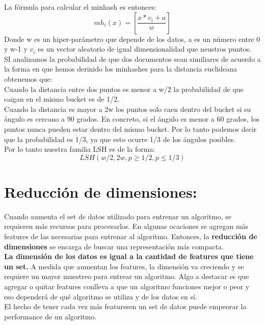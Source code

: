 \documentclass[titlepage,a4paper]{article}
\begin{document}
La fórmula para calcular el minhash es entonces:  $$ mh_i(x) = \left[ \frac{x*v_i +a}{w}\right] $$ Donde w es un hiper-parámetro que depende de los datos, a es un número entre 0 y w-1 y $v_i$ es un vector aleatorio de igual dimensionalidad que neustros puntos. \\

SI analizamos la probabilidad de que dos documentos sean similiares de acuerdo a la forma en que hemos derinido los minhashes  para la distancia euclideana obtenemos que: \\

Cuando la distancia entre dos puntos es menor a w/2 la probabilidad de que caigan en el mismo bucket es de 1/2. \\

Cuando la distancia es mayor a 2w  los puntos solo caen dentro del bucket si su ángulo es cercano a 90 grados. En concreto, si el ángulo es menor a 60 grados, los puntos nunca pueden estar dentro del mismo bucket. Por lo tanto podemos decir que la probabilidad es 1/3, ya que esto ocurre 1/3 de los ángulos posibles. \\

Por lo tanto nuestra familia LSH es de la forma: $$LSH(w/2, 2w, p \geq 1/2, p \leq 1/3)$$ 

\section*{Reducción de dimensiones:}

Cuando aumenta el set de datos utilizado para entrenar un algoritmo, se requieren más recursos para procesarlos. En algunas ocaciones se agregan más features de las necesarias para entrenar al algoritmo. Entonces, la \textbf{reducción de dimensiones} se encarga de buscar una representación más compacta. \\

\textbf{La dimensión de los datos es igual a la cantidad de features que tiene un set.} A medida que aumentan los features, la dimensión va creciendo y se requiere un mayor muestreo para entrear un algoritmo. Algo a destacar es que agregar o quitar features conlleva a que un algoritmo funciones mejor o peor y eso dependerá de qué algoritmo se utiliza y de los datos en sí. \\

El hecho de tener cada vez más featuresen un set de datos puede empeorar la performance de un algoritmo. \\
\end{document}
